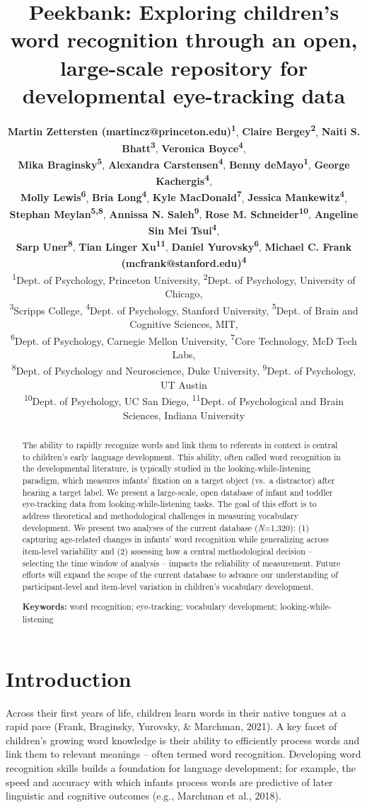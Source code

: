\documentclass[10pt, letterpaper]{article}
\title{Peekbank: Exploring children's word recognition through an open,
large-scale repository for developmental eye-tracking data}
\author{{\large \bf Martin Zettersten (martincz@princeton.edu)\textsuperscript{1}}, {\large \bf Claire Bergey\textsuperscript{2}}, {\large \bf Naiti S. Bhatt\textsuperscript{3}}, {\large \bf Veronica Boyce\textsuperscript{4}},  \\ {\large \bf Mika Braginsky\textsuperscript{5}}, {\large \bf Alexandra Carstensen\textsuperscript{4}}, {\large \bf Benny deMayo\textsuperscript{1}}, {\large \bf George Kachergis\textsuperscript{4}},  \\ {\large \bf Molly Lewis\textsuperscript{6}}, {\large \bf Bria Long\textsuperscript{4}}, {\large \bf Kyle MacDonald\textsuperscript{7}}, {\large \bf Jessica Mankewitz\textsuperscript{4}},  \\ {\large \bf Stephan Meylan\textsuperscript{5,8}}, {\large \bf Annissa N. Saleh\textsuperscript{9}}, {\large \bf Rose M. Schneider\textsuperscript{10}}, {\large \bf Angeline Sin Mei Tsui\textsuperscript{4}},  \\ {\large \bf Sarp Uner\textsuperscript{8}}, {\large \bf Tian Linger Xu\textsuperscript{11}}, {\large \bf Daniel Yurovsky\textsuperscript{6}}, {\large \bf Michael C. Frank (mcfrank@stanford.edu)\textsuperscript{4}}  \\ {\textsuperscript{1}}Dept. of Psychology, Princeton University, {\textsuperscript{2}}Dept. of Psychology, University of Chicago,  \\ {\textsuperscript{3}}Scripps College, {\textsuperscript{4}}Dept. of Psychology, Stanford University, {\textsuperscript{5}}Dept. of Brain and Cognitive Sciences, MIT,  \\ {\textsuperscript{6}}Dept. of Psychology, Carnegie Mellon University, {\textsuperscript{7}}Core Technology, McD Tech Labs,  \\ {\textsuperscript{8}}Dept. of Psychology and Neuroscience, Duke University, {\textsuperscript{9}}Dept. of Psychology, UT Austin \\ {\textsuperscript{10}}Dept. of Psychology, UC San Diego, {\textsuperscript{11}}Dept. of Psychological and Brain Sciences, Indiana University}
\begin{document}
\maketitle

\begin{abstract}
The ability to rapidly recognize words and link them to referents in
context is central to children's early language development. This
ability, often called word recognition in the developmental literature,
is typically studied in the looking-while-listening paradigm, which
measures infants' fixation on a target object (vs.~a distractor) after
hearing a target label. We present a large-scale, open database of
infant and toddler eye-tracking data from looking-while-listening tasks.
The goal of this effort is to address theoretical and methodological
challenges in measuring vocabulary development. We present two analyses
of the current database (\emph{N}=1,320): (1) capturing age-related
changes in infants' word recognition while generalizing across
item-level variability and (2) assessing how a central methodological
decision -- selecting the time window of analysis -- impacts the
reliability of measurement. Future efforts will expand the scope of the
current database to advance our understanding of participant-level and
item-level variation in children's vocabulary development.

\textbf{Keywords:}
word recognition; eye-tracking; vocabulary development;
looking-while-listening
\end{abstract}

\hypertarget{introduction}{%
\section{Introduction}\label{introduction}}

Across their first years of life, children learn words in their native
tongues at a rapid pace (Frank, Braginsky, Yurovsky, \& Marchman, 2021).
A key facet of children's growing word knowledge is their ability to
efficiently process words and link them to relevant meanings -- often
termed word recognition. Developing word recognition skills builds a
foundation for language development; for example, the speed and accuracy
with which infants process words are predictive of later linguistic and
cognitive outcomes (e.g., Marchman et al., 2018).
\end{document}
